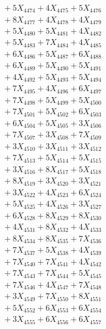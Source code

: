 \documentclass[a4paper,10pt]{article}
\begin{document}
{\begin{align}
&\;  + 5 X_{4474} + 4 X_{4475} + 5 X_{4476} \\[0.3ex]
&\;  + 8 X_{4477} + 4 X_{4478} + 4 X_{4479} \\[0.5ex]\allowbreak
&\;  + 5 X_{4480} + 5 X_{4481} + 4 X_{4482} \\[0.3ex]
&\;  + 5 X_{4483} + 7 X_{4484} + 4 X_{4485} \\[0.3ex]
&\;  + 6 X_{4486} + 5 X_{4487} + 6 X_{4488} \\[0.3ex]
&\;  + 6 X_{4489} + 5 X_{4490} + 5 X_{4491} \\[0.3ex]
&\;  + 4 X_{4492} + 5 X_{4493} + 5 X_{4494} \\[0.3ex]
&\;  + 7 X_{4495} + 4 X_{4496} + 6 X_{4497} \\[0.3ex]
&\;  + 7 X_{4498} + 5 X_{4499} + 5 X_{4500} \\[0.3ex]
&\;  + 7 X_{4501} + 5 X_{4502} + 6 X_{4503} \\[0.3ex]
&\;  + 6 X_{4504} + 5 X_{4505} + 3 X_{4506} \\[0.3ex]
&\;  + 7 X_{4507} + 3 X_{4508} + 7 X_{4509} \\[0.5ex]\allowbreak
&\;  + 3 X_{4510} + 3 X_{4511} + 3 X_{4512} \\[0.3ex]
&\;  + 7 X_{4513} + 5 X_{4514} + 5 X_{4515} \\[0.3ex]
&\;  + 3 X_{4516} + 8 X_{4517} + 5 X_{4518} \\[0.3ex]
&\;  + 8 X_{4519} + 3 X_{4520} + 3 X_{4521} \\[0.3ex]
&\;  + 3 X_{4522} + 4 X_{4523} + 6 X_{4524} \\[0.3ex]
&\;  + 5 X_{4525} + 4 X_{4526} + 3 X_{4527} \\[0.3ex]
&\;  + 6 X_{4528} + 8 X_{4529} + 8 X_{4530} \\[0.3ex]
&\;  + 4 X_{4531} + 8 X_{4532} + 4 X_{4533} \\[0.3ex]
&\;  + 8 X_{4534} + 8 X_{4535} + 7 X_{4536} \\[0.3ex]
&\;  + 7 X_{4537} + 5 X_{4538} + 4 X_{4539} \\[0.5ex]\allowbreak
&\;  + 7 X_{4540} + 7 X_{4541} + 4 X_{4542} \\[0.3ex]
&\;  + 7 X_{4543} + 7 X_{4544} + 5 X_{4545} \\[0.3ex]
&\;  + 7 X_{4546} + 4 X_{4547} + 7 X_{4548} \\[0.3ex]
&\;  + 3 X_{4549} + 7 X_{4550} + 8 X_{4551} \\[0.3ex]
&\;  + 5 X_{4552} + 6 X_{4553} + 6 X_{4554} \\[0.3ex]
&\;  + 3 X_{4555} + 6 X_{4556} + 6 X_{4557} \\[0.3ex]

\end{align}}
\end{document}

